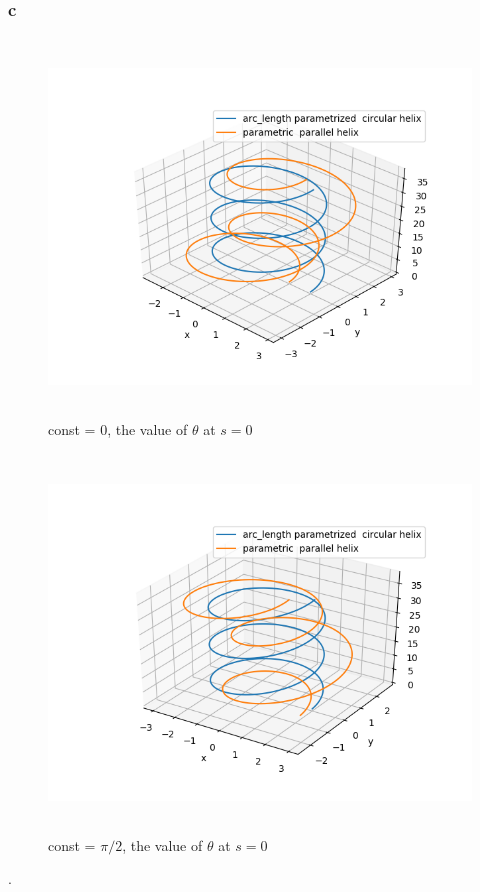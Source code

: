 \documentclass[
	12pt, %
]{fphw}
\theoremstyle{plain}
\begin{document}
\subsubsection*{c}
\begin{figure}[!ht]
     \centering
     \includegraphics[width=\linewidth, width=12cm, height=10cm]{24_constant=0_1.png}
     \caption{const = 0, the value of $\theta$ at $s=0$}
 \end{figure}
 \begin{figure}[!ht]
     \centering
     \includegraphics[width=\linewidth, width=12cm, height=10cm]{24_constant=pi2.png}
     \caption{const = $\pi/2$, the value of $\theta$ at $s=0$}
 \end{figure}
.\\
\\
\\
\\
\\
\\
\end{document}
